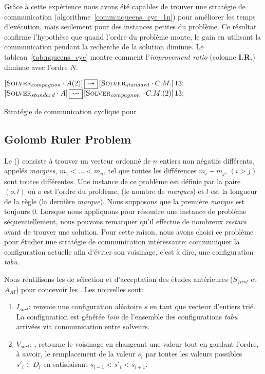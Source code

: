 Grâce à cette expérience nous avons été capables de trouver une stratégie de communication (algorithme~\ref{comm:nqueens_cyc_1n}) pour améliorer les temps d'exécution, mais seulement pour des instances petites du problème. Ce résultat confirme l'hypothèse que quand l'ordre du problème monte, le gain en utilisant la communication pendant la recherche de la solution diminue. Le tableau~\ref{tab:nqueens_cyc} montre comment l'\textit{improvement ratio} (colonne \textbf{I.R.}) diminue avec l'ordre $N$. 

\begin{algorithm}[!h]
\dontprintsemicolon
\SetNoline
$\left[\eqsolverposl{compagnon}\cdot A(2)\right] \oneton \left[\eqsolverposl{standard}\cdot C.M.\right]13;$\;
$\left[\eqsolverposl{standard}\cdot A\right] \oneton \left[\eqsolverposl{compagnon}\cdot C.M.(2)\right]13;$
\caption{Stratégie de communication cyclique \oneTn{} pour \NQP}\label{comm:nqueens_cyc_1n}
\end{algorithm}




\subsection{Golomb Ruler Problem}

Le \grp{} (\GRP) consiste à trouver un vecteur ordonné de $n$ entiers non négatifs différents, appelés \textit{marques}, $m_1<\dots<m_n$, tel que toutes les différences $m_i- m_j$, $(i>j)$ sont toutes différentes. Une instance de ce problème est définie par la paire $(o,l)$ où $o$ est l'ordre du problème, (le nombre de \textit{marques}) et  $l$ est la longueur de la règle (la dernière {\it marque}). Nous supposons que la première \textit{marque} est toujours 0. Lorsque nous appliquons \posl{} pour résoudre une instance de problème séquentiellement, nous pouvons remarquer qu'il effectue de nombreux {\it restars} avant de trouver une solution. Pour cette raison, nous avons choisi ce problème pour étudier une stratégie de communication intéressante: communiquer la configuration actuelle afin d'éviter son voisinage, c'est à dire, une configuration {\it tabu}.

Nous réutilisons les \ms{} de sélection et d'acceptation des études antérieures ($S_{first}$ et$A_{AI}$) pour concevoir les \ass. Les nouvelles \ms{} sont:
\begin{enumerate}
\item $I_{sort}$: renvoie une configuration aléatoire $s$ en tant que vecteur d'entiers trié. La configuration est générée \textit{loin} de l'ensemble des configurations {\it tabu} arrivées via communication entre solveurs.
\item $V_{sort}$: , retourne le voisinage en changeant une valeur tout en gardant l'ordre, à savoir, le remplacement de la valeur $s_i$ par toutes les valeurs possibles $s'_i \in D_i$ en satisfaisant $s_{i-1}< s'_i < s_{i+1}$.
\end{enumerate}


